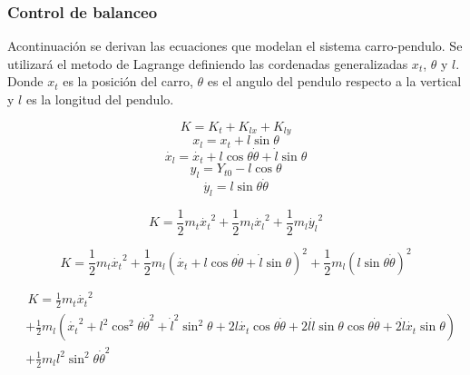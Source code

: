 \documentclass{article}
\begin{document}
            \subsubsection{Control de balanceo}

            Acontinuación se derivan las ecuaciones que modelan el sistema carro-pendulo. Se utilizará el metodo de Lagrange definiendo las cordenadas generalizadas 
            \(x_t\), \(\theta\) y \(l\). Donde \(x_t\) es la posición del carro, \(\theta\) es el angulo del pendulo respecto a la vertical y \(l\) es la longitud del pendulo.

            
            \begin{equation}\label{eq:kinetic1}
                K = K_t + K_{lx} + K_{ly}
            \end{equation}
            \begin{equation}\label{eq:xl}
                x_l=x_t+l\sin{\theta}
            \end{equation}
            \begin{equation}\label{eq:dxl}
                \dot{x_l}=\dot{x_t}+l\cos{\theta}\dot{\theta}+\dot{l}\sin{\theta}
            \end{equation}
            \begin{equation}\label{eq:y}
                y_l=Y_{t0}-l\cos{\theta}
            \end{equation}
            \begin{equation}\label{eq:dy}
                \dot{y_l}=l\sin{\theta}\dot{\theta}
            \end{equation}

            \begin{equation}\label{eq:kinetic2}
                K = \frac{1}{2}m_t\dot{x_t}^2   +\frac{1}{2}m_l\dot{x_l}^2  +\frac{1}{2}m_l\dot{y_l}^2
            \end{equation}

            \begin{equation}\label{eq:kinetic3}
                K = \frac{1}{2}m_t\dot{x_t}^2   +\frac{1}{2}m_l(\dot{x_t}+l\cos{\theta}\dot{\theta}+\dot{l}\sin{\theta})^2  +\frac{1}{2}m_l(l\sin{\theta}\dot{\theta})^2
            \end{equation}

            \begin{equation}\label{eq:kinetic4}
                \begin{split}
                    & \,K = \frac{1}{2}m_t\dot{x_t}^2 \\ 
                    &+\frac{1}{2}m_l(\dot{x_t}^2
                +l^2\cos^2{\theta}\dot{\theta}^2
                +\dot{l}^2\sin^2{\theta}+2l\dot{x_t}\cos{\theta}\dot{\theta}
                +2l\dot{l}\sin{\theta}\cos{\theta}\dot{\theta}
                +2\dot{l}\dot{x_t}\sin{\theta})\\
                &+\frac{1}{2}m_ll^2\sin^2{\theta}\dot{\theta}^2
                \end{split}
            \end{equation}
\end{document}

